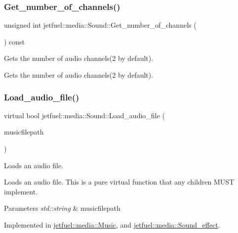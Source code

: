 \subsubsection{\texorpdfstring{Get\+\_\+number\+\_\+of\+\_\+channels()}{Get\_number\_of\_channels()}}
{\footnotesize\ttfamily unsigned int jetfuel\+::media\+::\+Sound\+::\+Get\+\_\+number\+\_\+of\+\_\+channels (\begin{DoxyParamCaption}{ }\end{DoxyParamCaption}) const\hspace{0.3cm}{\ttfamily [inline]}}



Gets the number of audio channels(2 by default). 

Gets the number of audio channels(2 by default). \mbox{\label{classjetfuel_1_1media_1_1Sound_ab18ff9b8dd2001fa11b17649a6a3defb}} 
\subsubsection{\texorpdfstring{Load\+\_\+audio\+\_\+file()}{Load\_audio\_file()}}
{\footnotesize\ttfamily virtual bool jetfuel\+::media\+::\+Sound\+::\+Load\+\_\+audio\+\_\+file (\begin{DoxyParamCaption}\item[{const std\+::string}]{musicfilepath }\end{DoxyParamCaption})\hspace{0.3cm}{\ttfamily [pure virtual]}}



Loads an audio file. 

Loads an audio file. This is a pure virtual function that any children M\+U\+ST implement.


\begin{DoxyParams}{Parameters}
{\em std\+::string} & musicfilepath \\
\hline
\end{DoxyParams}


Implemented in \hyperlink{classjetfuel_1_1media_1_1Music_ae24079b0301f5cf845d094e32ed22da1}{jetfuel\+::media\+::\+Music}, and \hyperlink{classjetfuel_1_1media_1_1Sound__effect_a1ad701cd2318e960bde2ab063aeabb75}{jetfuel\+::media\+::\+Sound\+\_\+effect}.

